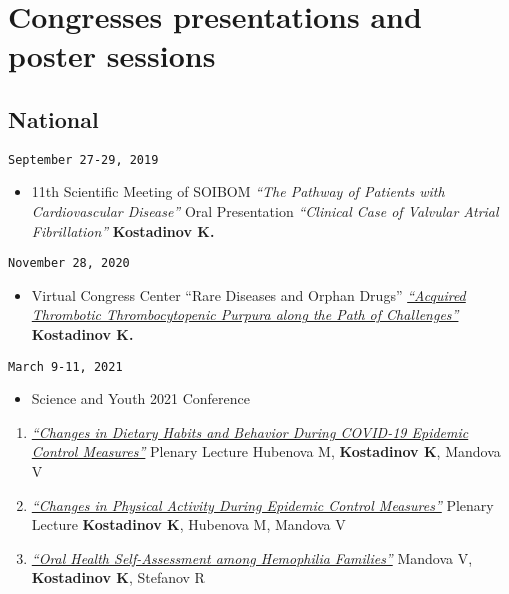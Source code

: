 \documentclass[
  12pt,
  letterpaper,
  DIV=11,
  numbers=noendperiod]{scrartcl}
\providecommand{\tightlist}{%
  \setlength{\itemsep}{0pt}\setlength{\parskip}{0pt}}\usepackage{longtable,booktabs,array}
\begin{document}
\section{Congresses presentations and poster
sessions}\label{congresses-presentations-and-poster-sessions}

\subsection{National}\label{national-1}

\texttt{September\ 27-29,\ 2019}

\begin{itemize}
\tightlist
\item
  11th Scientific Meeting of SOIBOM \textbar{} \emph{``The Pathway of
  Patients with Cardiovascular Disease''} \textbar{} Oral Presentation
  \textbar{} \emph{``Clinical Case of Valvular Atrial Fibrillation''}
  \textbar{} \textbf{Kostadinov K.}
\end{itemize}

\texttt{November\ 28,\ 2020}

\begin{itemize}
\tightlist
\item
  Virtual Congress Center ``Rare Diseases and Orphan Drugs'' \textbar{}
  \emph{\href{https://youtu.be/R_UbvDcyTxs}{``Acquired Thrombotic
  Thrombocytopenic Purpura along the Path of Challenges''}} \textbar{}
  \textbf{Kostadinov K.}
\end{itemize}

\texttt{March\ 9-11,\ 2021}

\begin{itemize}
\tightlist
\item
  Science and Youth 2021 Conference
\end{itemize}

\begin{enumerate}
\def\labelenumi{\arabic{enumi}.}
\item
  \emph{\href{https://www.asclepius.bg/images/nm2021/\%D0\%9F\%D0\%A0\%D0\%9E\%D0\%93\%D0\%A0\%D0\%90\%D0\%9C\%D0\%90-\%D0\%9D\%D0\%90\%D0\%A3\%D0\%9A\%D0\%90-\%D0\%98-\%D0\%9C\%D0\%9B\%D0\%90\%D0\%94\%D0\%9E\%D0\%A1\%D0\%A2-2021.pdf}{``Changes
  in Dietary Habits and Behavior During COVID-19 Epidemic Control
  Measures''}} \textbar{} Plenary Lecture \textbar{} Hubenova M,
  \textbf{Kostadinov K}, Mandova V
\item
  \emph{\href{https://www.asclepius.bg/images/nm2021/\%D0\%9F\%D0\%A0\%D0\%9E\%D0\%93\%D0\%A0\%D0\%90\%D0\%9C\%D0\%90-\%D0\%9D\%D0\%90\%D0\%A3\%D0\%9A\%D0\%90-\%D0\%98-\%D0\%9C\%D0\%9B\%D0\%90\%D0\%94\%D0\%9E\%D0\%A1\%D0\%A2-2021.pdf}{``Changes
  in Physical Activity During Epidemic Control Measures''}} \textbar{}
  Plenary Lecture \textbar{} \textbf{Kostadinov K}, Hubenova M, Mandova
  V
\item
  \emph{\href{https://asclepius.bg/cnm/wp-content/uploads/2022/05/Sbornik-Nauka-i-Mladost-2021.pdf}{``Oral
  Health Self-Assessment among Hemophilia Families''}} \textbar{}
  Mandova V, \textbf{Kostadinov K}, Stefanov R
\end{enumerate}
\end{document}
